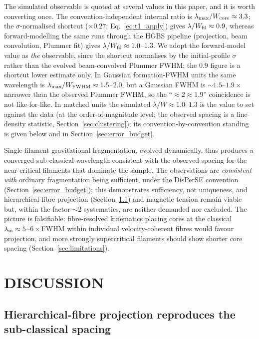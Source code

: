 \documentclass[usenatbib,twoside,twocolumn]{mnras}
\begin{document}
The simulated observable is quoted at several values in this paper, and it is worth converting once. The convention-independent internal ratio is $\lambda_{\rm max}/W_{\rm core}\approx3.3$; the $\sigma$-normalised shortcut ($\times0.27$; Eq.~\ref{eq:t1_apply}) gives $\lambda/W_{\rm fil}\approx0.9$, whereas forward-modelling the same runs through the HGBS pipeline (projection, beam convolution, Plummer fit) gives $\lambda/W_{\rm fil}\approx1.0$--$1.3$. We adopt the forward-model value as \emph{the} observable, since the shortcut normalises by the initial-profile $\sigma$ rather than the evolved beam-convolved Plummer FWHM; the $0.9$ figure is a shortcut lower estimate only. In Gaussian formation-FWHM units the same wavelength is $\lambda_{\rm max}/W_{\rm FWHM}\approx1.5$--$2.0$, but a Gaussian FWHM is $\sim1.5$--$1.9\times$ narrower than the observed Plummer FWHM, so the ``$\approx2\approx1.9$'' coincidence is not like-for-like. In matched units the simulated $\lambda/W\approx1.0$--$1.3$ is the value to set against the data (at the order-of-magnitude level; the observed spacing is a line-density statistic, Section~\ref{sec:clustering}); its convention-by-convention standing is given below and in Section~\ref{sec:error_budget}.

Single-filament gravitational fragmentation, evolved dynamically, thus produces a converged sub-classical wavelength consistent with the observed spacing for the near-critical filaments that dominate the sample. The observations are \emph{consistent with} ordinary fragmentation being sufficient, under the DisPerSE convention (Section~\ref{sec:error_budget}); this demonstrates sufficiency, not uniqueness, and hierarchical-fibre projection (Section~\ref{sec:fibre_projection}) and magnetic tension remain viable but, within the factor-$\sim$2 systematics, are neither demanded nor excluded. The picture is falsifiable: fibre-resolved kinematics placing cores at the classical $\lambda_{\rm m}\approx5$--$6\times$FWHM within individual velocity-coherent fibres would favour projection, and more strongly supercritical filaments should show shorter core spacing (Section~\ref{sec:limitations}).

\section{DISCUSSION}
\label{sec:discussion}

\subsection{Hierarchical-fibre projection reproduces the sub-classical spacing}
\label{sec:fibre_projection}
\end{document}

